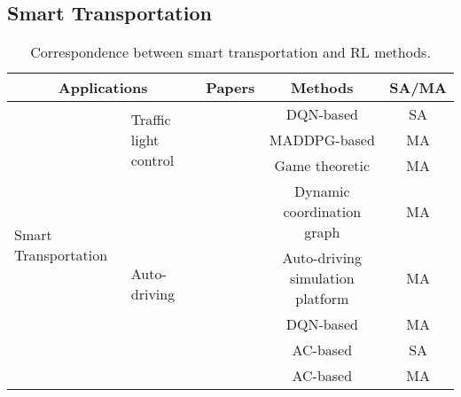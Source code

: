 \documentclass[acmsmall]{acmart}
\begin{document}
\subsection{Smart Transportation}
\begin{table}[]
\caption{Correspondence between smart transportation and RL methods.}
\label{transportation}
\centering
\begin{tabularx}{\textwidth}{|XX|c|c|c|}
\hline
\multicolumn{2}{|c|}{Applications}                                                                   & Papers                             & Methods                          & SA/MA \\ \hline
\multicolumn{1}{|X|}{\multirow{8}{=}{\centering Smart Transportation}} & \multirow{3}{=}{\centering Traffic light control} & \cite{7508798}                     & DQN-based \cite{dqn}             & SA       \\ \cline{3-5} 
\multicolumn{1}{|X|}{}                                      &                                        & \cite{9103316}                     & MADDPG-based \cite{maddpg}       & MA       \\ \cline{3-5} 
\multicolumn{1}{|X|}{}                                      &                                        & \cite{9681232}                     & Game theoretic                   & MA       \\ \cline{2-5} 
\multicolumn{1}{|X|}{}                                      & \multirow{5}{=}{\centering Auto-driving}          & \cite{8638814}                     & Dynamic coordination graph       & MA       \\ \cline{3-5} 
\multicolumn{1}{|X|}{}                                      &                                        & \cite{pmlr-v155-zhou21a}           & Auto-driving simulation platform & MA       \\ \cline{3-5} 
\multicolumn{1}{|X|}{}                                      &                                        & \cite{10.1007/978-3-030-47358-7_7} & DQN-based \cite{dqn}             & MA       \\ \cline{3-5} 
\multicolumn{1}{|X|}{}                                      &                                        & \cite{9694460}                     & AC-based \cite{ac}     & SA       \\ \cline{3-5} 
\multicolumn{1}{|X|}{}                                      &                                        & \cite{zhou2022multi}               & AC-based \cite{a3c}    & MA       \\ \hline
\end{tabularx}
\end{table}
\end{document}

